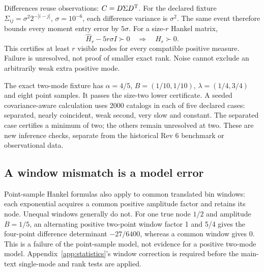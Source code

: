 Differences reuse observations: $C=D\Sigma D^{\rm T}$.
For the declared fixture $\Sigma_{ij}=\sigma^2 2^{-|i-j|}$,
$\sigma=10^{-6}$, each difference variance is $\sigma^2$.
The same event therefore bounds every moment entry error by $5\sigma$.
For a size-$r$ Hankel matrix,
\[
 \widehat H_r-5r\sigma I\succ 0
 \quad\Longrightarrow\quad H_r\succ 0.
\]
This certifies at least $r$ visible nodes for every compatible positive
measure. Failure is unresolved, not proof of smaller exact rank.
Noise cannot exclude an arbitrarily weak extra positive mode.

The exact two-mode fixture has $\alpha=4/5$, $B=(1/10,1/10)$,
$\lambda=(1/4,3/4)$ and eight point samples. It passes the size-two lower
certificate. A seeded covariance-aware calculation uses 2000 catalogs in
each of five declared cases: separated, nearly coincident, weak second,
very slow and constant. The separated case certifies a minimum of two;
the others remain unresolved at two. These are new inference checks,
separate from the historical Rev 6 benchmark or observational data.



\subsection{A window mismatch is a model error}
Point-sample Hankel formulas also apply to common translated bin windows:
each exponential acquires a common positive amplitude factor and retains
its node. Unequal windows generally do not. For one true node $1/2$ and amplitude $B=1/5$,
an alternating positive two-point window factor 1 and 5/4 gives the
four-point difference determinant $-27/6400$, whereas a common window
gives 0. This is a failure of the point-sample model, not evidence for a
positive two-mode model. Appendix~\ref{app:statistics}'s window correction
is required before the main-text single-mode and rank tests are applied.

